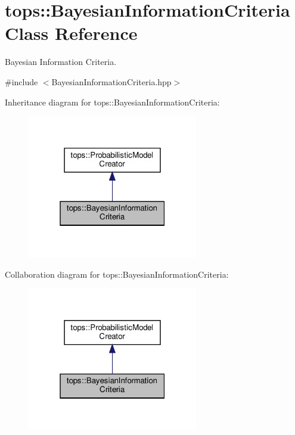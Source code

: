 \hypertarget{classtops_1_1BayesianInformationCriteria}{}\section{tops\+:\+:Bayesian\+Information\+Criteria Class Reference}
\label{classtops_1_1BayesianInformationCriteria}


Bayesian Information Criteria.  




{\ttfamily \#include $<$Bayesian\+Information\+Criteria.\+hpp$>$}



Inheritance diagram for tops\+:\+:Bayesian\+Information\+Criteria\+:
\nopagebreak
\begin{figure}[H]
\begin{center}
\leavevmode
\includegraphics[width=211pt]{classtops_1_1BayesianInformationCriteria__inherit__graph}
\end{center}
\end{figure}


Collaboration diagram for tops\+:\+:Bayesian\+Information\+Criteria\+:
\nopagebreak
\begin{figure}[H]
\begin{center}
\leavevmode
\includegraphics[width=211pt]{classtops_1_1BayesianInformationCriteria__coll__graph}
\end{center}
\end{figure}
